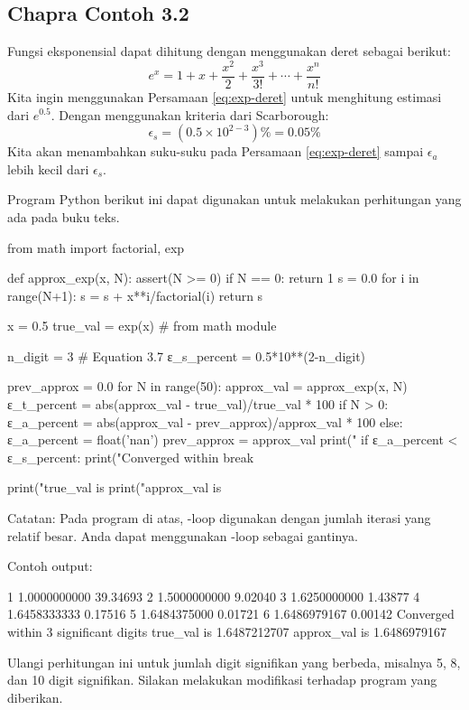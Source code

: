 \subsection{Chapra Contoh 3.2}

Fungsi eksponensial dapat dihitung dengan menggunakan deret sebagai berikut:
\begin{equation}
e^{x} = 1 + x + \frac{x^2}{2} + \frac{x^3}{3!} + \cdots + \frac{x^n}{n!}
\label{eq:exp-deret}
\end{equation}
Kita ingin menggunakan Persamaan \eqref{eq:exp-deret} untuk menghitung estimasi
dari $e^{0.5}$.
Dengan menggunakan kriteria dari Scarborough:
\begin{equation*}
\epsilon_{s} = (0.5 \times 10^{2-3}) \% = 0.05 \%
\end{equation*}
Kita akan menambahkan suku-suku pada Persamaan \eqref{eq:exp-deret} sampai $\epsilon_{a}$
lebih kecil dari $\epsilon_{s}$.

Program Python berikut ini dapat digunakan untuk melakukan perhitungan yang ada pada buku teks.
\begin{pythoncode}
from math import factorial, exp

def approx_exp(x, N):
    assert(N >= 0)
    if N == 0:
        return 1
    s = 0.0
    for i in range(N+1):
        s = s + x**i/factorial(i)
    return s
  
x = 0.5
true_val = exp(x) # from math module
  
n_digit = 3
# Equation 3.7
ε_s_percent = 0.5*10**(2-n_digit)
  
prev_approx = 0.0
for N in range(50):
    approx_val = approx_exp(x, N)
    ε_t_percent = abs(approx_val - true_val)/true_val * 100
    if N > 0:
        ε_a_percent = abs(approx_val - prev_approx)/approx_val * 100
    else:
        ε_a_percent = float('nan')
    prev_approx = approx_val
    print("%
    if ε_a_percent < ε_s_percent:
        print("Converged within %
        break

print("true_val   is %
print("approx_val is %
\end{pythoncode}

Catatan: Pada program di atas, -loop digunakan dengan jumlah iterasi yang relatif
besar. Anda dapat menggunakan -loop sebagai gantinya.

Contoh output:
\begin{textcode}
  1       1.0000000000   39.34693%
  2       1.5000000000    9.02040%
  3       1.6250000000    1.43877%
  4       1.6458333333    0.17516%
  5       1.6484375000    0.01721%
  6       1.6486979167    0.00142%
Converged within 3 significant digits
true_val   is       1.6487212707
approx_val is       1.6486979167
\end{textcode}


\begin{soal}
Ulangi perhitungan ini untuk jumlah digit signifikan yang berbeda, misalnya 5, 8, dan 10
digit signifikan. Silakan melakukan modifikasi terhadap program yang diberikan.
\end{soal}